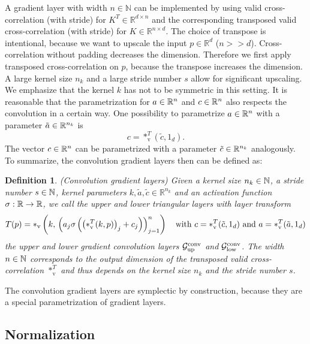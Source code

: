 \documentclass[twoside,a4paper]{article}
\newtheorem{definition}{Definition}
\begin{document}
A gradient layer with width $n \in \mathbb{N}$ can be implemented by 
using valid cross-correlation (with stride) for $K^T \in \mathbb{R}^{d \times n}$ and the
corresponding transposed valid cross-correlation (with stride) for $K \in \mathbb{R}^{n \times d}$.
The choice of transpose is intentional, because we want to upscale the input $p \in \mathbb{R}^d$ ($n >> d$). 
Cross-correlation without padding decreases the dimension. Therefore we first apply 
transposed cross-correlation on $p$, because the transpose increases the dimension.
A large kernel size $n_k$ and a large stride number $s$ allow for significant upscaling.
We emphasize that the kernel $k$ has not to be symmetric in this setting. 
It is reasonable that the parametrization for $a \in \mathbb{R}^n$ and $c \in \mathbb{R}^n$ also respects
the convolution in a certain way.
One possibility to parametrize $a \in \mathbb{R}^n$ with a parameter $\tilde{a} \in \mathbb{R}^{n_k}$ is
\begin{equation*}
	c = *_{\text{v}}^T(\tilde{c},1_d)
	.
\end{equation*}
The vector $c \in \mathbb{R}^n$ can be parametrized with a parameter $\tilde{c} \in \mathbb{R}^{n_k}$ analogously.
To summarize, the convolution gradient layers then can be defined as:
\begin{definition}
	(Convolution gradient layers)
	Given a kernel size $n_k \in \mathbb{N}$, a stride number $s \in \mathbb{N}$,
	kernel parameters $k,\tilde{a},\tilde{c} \in \mathbb{R}^{n_k}$ and
	an activation function $\sigma : \mathbb{R} \to \mathbb{R}$,
	we call the upper and lower triangular layers with layer transform
	\begin{align*}
		T(p) = *_{\text{v}} \left( k, \, \left( a_j \sigma \left( \left( *_{\text{v}}^T(k,p) \right)_j + c_j \right) \right)_{j=1}^n \right) 
		\quad
		\text{with } c = *_{\text{v}}^T(\tilde{c},1_d) 
		\text{ and } a = *_{\text{v}}^T(\tilde{a},1_d)
	\end{align*}
	the upper and lower gradient convolution layers 
	$\mathcal{G}_{\text{up}}^{\text{conv}}$ and $\mathcal{G}_{\text{low}}^{\text{conv}}$.
	The width $n \in \mathbb{N}$ corresponds to the output dimension of the transposed valid cross-correlation $*_{\text{v}}^T$
	and thus depends on the kernel size $n_k$ and the stride number $s$.
\end{definition}

The convolution gradient layers are symplectic by construction,
because they are a special parametrization of gradient layers.


\subsection{Normalization}
\end{document}
